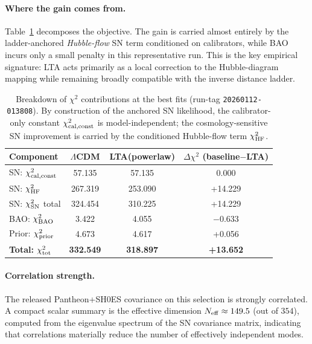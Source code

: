 \documentclass[10pt]{article}
\begin{document}
\paragraph{Where the gain comes from.}
Table~\ref{tab:chi2_breakdown} decomposes the objective. The gain is carried almost entirely by the
ladder-anchored \emph{Hubble-flow} SN term conditioned on calibrators, while BAO incurs only a small
penalty in this representative run. This is the key empirical signature: LTA acts primarily as a
local correction to the Hubble-diagram mapping while remaining broadly compatible with the inverse
distance ladder.

\begin{table}[!htbp]
\centering
\caption{Breakdown of $\chi^2$ contributions at the best fits (run-tag \texttt{20260112-013808}).
By construction of the anchored SN likelihood, the calibrator-only constant
\(\chi^2_{\rm cal,const}\) is model-independent; the cosmology-sensitive SN improvement is carried
by the conditioned Hubble-flow term \(\chi^2_{\rm HF}\).}
\label{tab:chi2_breakdown}
\begin{tabular}{lccc}
\toprule
Component & $\Lambda$CDM & LTA(powerlaw) & $\Delta\chi^2$ (baseline$-$LTA) \\
\midrule
SN: $\chi^2_{\rm cal,const}$ & 57.135 & 57.135 & 0.000 \\
SN: $\chi^2_{\rm HF}$        & 267.319 & 253.090 & +14.229 \\
SN: $\chi^2_{\rm SN}$ total  & 324.454 & 310.225 & +14.229 \\
BAO: $\chi^2_{\rm BAO}$      & 3.422   & 4.055   & $-0.633$ \\
Prior: $\chi^2_{\rm prior}$  & 4.673   & 4.617   & +0.056 \\
\midrule
\textbf{Total: $\chi^2_{\rm tot}$} & \textbf{332.549} & \textbf{318.897} & \textbf{+13.652} \\
\bottomrule
\end{tabular}
\end{table}

\paragraph{Correlation strength.}
The released Pantheon+SH0ES covariance on this selection is strongly correlated. A compact scalar
summary is the effective dimension \(N_{\rm eff}\approx 149.5\) (out of \(354\)), computed from the
eigenvalue spectrum of the SN covariance matrix, indicating that correlations materially reduce the
number of effectively independent modes.
\end{document}
